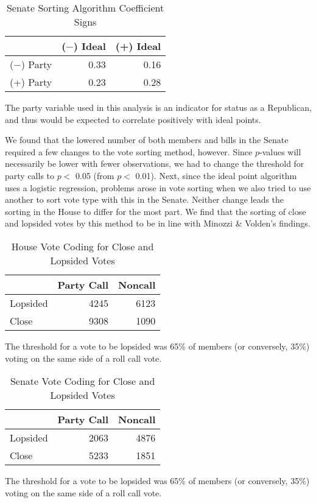 \documentclass[12pt]{article}
\newcommand\fnote[1]{\captionsetup{font=small}\caption*{#1}}
\begin{document}
\begin{table}[H]
	\centering
	\singlespacing
	\caption{Senate Sorting Algorithm Coefficient Signs}
	\begin{tabular}{rrr}
		\hline
		& ($-$) Ideal & (+) Ideal \\ 
		\hline
		($-$) Party & 0.33 & 0.16 \\ 
		(+) Party & 0.23 & 0.28 \\ 
		\hline
	\end{tabular}
	\fnote{The party variable used in this analysis is an indicator for status as a Republican, and thus would be expected to correlate positively with ideal points.}
\end{table}

We found that the lowered number of both members and bills in the Senate required a few changes to the vote sorting method, however. Since $p$-values will necessarily be lower with fewer observations, we had to change the threshold for party calls to $p <$ 0.05 (from $p <$ 0.01). Next, since the ideal point algorithm uses a logistic regression, problems arose in vote sorting when we also tried to use another to sort vote type with this in the Senate. Neither change leads the sorting in the House to differ for the most part. We find that the sorting of close and lopsided votes by this method to be in line with Minozzi \& Volden's findings.

\begin{table}[H]
	\centering
	\singlespacing
	\caption{House Vote Coding for Close and Lopsided Votes} 
	\begin{tabular}{lrr}
		\hline
		& Party Call & Noncall \\ 
		\hline
		Lopsided & 4245 & 6123 \\ 
		Close & 9308 & 1090 \\ 
		\hline
	\end{tabular}
	\fnote{The threshold for a vote to be lopsided was 65\% of members (or conversely, 35\%) voting on the same side of a roll call vote.}
\end{table}

\begin{table}[H]
	\centering
	\singlespacing
	\caption{Senate Vote Coding for Close and Lopsided Votes} 
	\begin{tabular}{lrr}
		\hline
		& Party Call & Noncall \\ 
		\hline
		Lopsided & 2063 & 4876 \\ 
		Close & 5233 & 1851 \\ 
		\hline
	\end{tabular}
	\fnote{The threshold for a vote to be lopsided was 65\% of members (or conversely, 35\%) voting on the same side of a roll call vote.}
\end{table}
\end{document}
